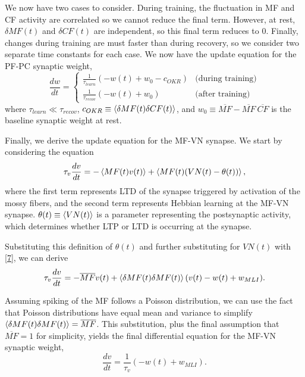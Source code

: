 \documentclass[10pt]{article}
\begin{document}
We now have two cases to consider. During training, the fluctuation in MF and CF activity are correlated so we cannot reduce the final term. However, at rest, $\delta MF(t)$ and $\delta CF(t)$ are independent, so this final term reduces to 0. Finally, changes during training are must faster than during recovery, so we consider two separate time constants for each case. We now have the update equation for the PF-PC synaptic weight, 
\begin{equation}
    \label{12}
    \frac{dw}{dt} = \begin{cases}
    \frac{1}{\tau_{learn}}(-w(t)+w_0-c_{OKR}) & \text{(during training)} \\
    \frac{1}{\tau_{recov}}(-w(t)+w_0) & \text{(after training)}
    \end{cases}
\end{equation}
where \(\tau_{learn}\ll \tau_{recov}\), \(c_{OKR} \equiv  \braket{\delta MF(t) \delta CF(t)}\), and \(w_0\equiv \overline{MF}-\overline{MF}\ \overline{CF}\) is the baseline synaptic weight at rest.

Finally, we derive the update equation for the MF-VN synapse. We start by considering the equation
\begin{equation}
    \label{13}
    \tau_v \frac{dv}{dt} = -\braket{MF(t)v(t)} + \braket{MF(t)(VN(t)-\theta(t))},
\end{equation}
where the first term represents LTD of the synapse triggered by activation of the mossy fibers, and the second term represents Hebbian learning at the MF-VN synapse. \(\theta(t)\equiv\braket{VN(t)}\) is a parameter representing the postsynaptic activity, which determines whether LTP or LTD is occurring at the synapse.

Substituting this definition of \(\theta(t)\) and further substituting for \(VN(t)\) with \eqref{7}, we can derive \begin{equation}
    \label{14}
    \tau_v \frac{dv}{dt} = -\overline{MF} v(t) + \braket{\delta MF(t) \delta MF(t)}(v(t)-w(t)+w_{MLI}).
\end{equation}

Assuming spiking of the MF follows a Poisson distribution, we can use the fact that Poisson distributions have equal mean and variance to simplify \(\braket{\delta MF(t) \delta MF(t)} = \overline{MF}\). This substitution, plus the final assumption that \(\overline{MF}=1\) for simplicity, yields the final differential equation for the MF-VN synaptic weight,
\begin{equation}
    \label{15}
    \frac{dv}{dt} = \frac{1}{\tau_v}(-w(t)+w_{MLI}).
\end{equation}
\end{document}
